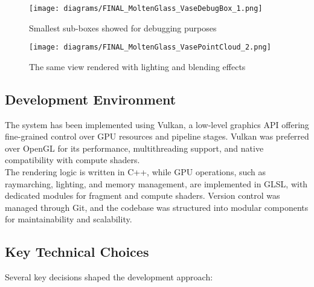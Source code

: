 \documentclass{rapportcs}
\begin{document}
\begin{enumerate}
        \begin{figure}[H]
            \centering
            \texttt{[image: diagrams/FINAL\_MoltenGlass\_VaseDebugBox\_1.png]}
            \caption{Smallest sub-boxes showed for debugging purposes}
            \label{fig:label_image}
        \end{figure}
        
        \begin{figure}[H]
            \centering
            \texttt{[image: diagrams/FINAL\_MoltenGlass\_VasePointCloud\_2.png]}
            \caption{The same view rendered with lighting and blending effects}
            \label{fig:label_image}
        \end{figure}
    \end{enumerate}

\newpage

\subsection{Development Environment}

    The system has been implemented using Vulkan, a low-level graphics API offering fine-grained control over GPU resources and pipeline stages.
    Vulkan was preferred over OpenGL for its performance, multithreading support, and native compatibility with compute shaders. \\

    \noindent The rendering logic is written in C++, while GPU operations, such as raymarching, lighting, and memory management, are implemented in GLSL, with dedicated modules for fragment and compute shaders.
    Version control was managed through Git, and the codebase was structured into modular components for maintainability and scalability.

\subsection{Key Technical Choices}

    Several key decisions shaped the development approach:\\
    
\end{document}

